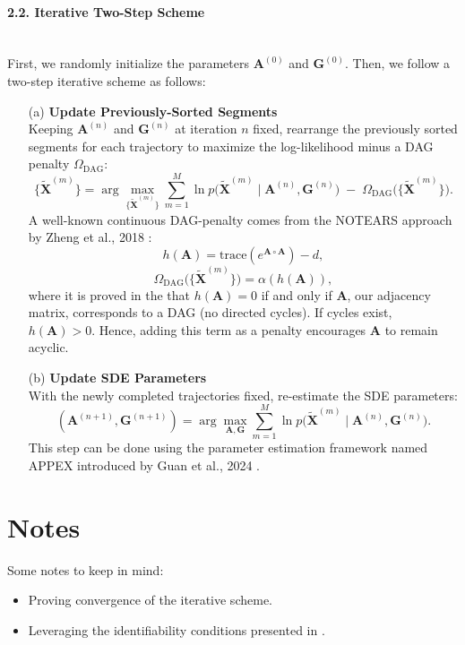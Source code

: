 \documentclass[a4paper, 11pt]{article}
\begin{document}
\begin{sloppypar}
\paragraph{2.2. Iterative Two-Step Scheme} \mbox{}\\
First, we randomly initialize the parameters
$\mathbf{A}^{(0)}$ and $\mathbf{G}^{(0)}$. Then, we follow a two-step
iterative scheme as follows:
\begin{enumerate}
  \item[(a)] \textbf{Update Previously-Sorted Segments} \\
    Keeping $\mathbf{A}^{(n)}$ and $\mathbf{G}^{(n)}$ at iteration $n$ fixed, rearrange the
    previously sorted segments for each trajectory to maximize the log-likelihood minus a
    DAG penalty $\Omega_{\mathrm{DAG}}$:
    \[
    \{\widetilde{\mathbf{X}}^{(m)}\}
    = 
    \arg\max_{\{\widetilde{\mathbf{X}}^{(m)}\}}
    \sum_{m=1}^M
    \ln p\bigl(\widetilde{\mathbf{X}}^{(m)} \mid \mathbf{A}^{(n)}, \mathbf{G}^{(n)}\bigr)
    \;-\; 
    \Omega_{\mathrm{DAG}}\bigl(\{\widetilde{\mathbf{X}}^{(m)}\}\bigr).
    \]
    A well-known continuous DAG-penalty comes from the NOTEARS approach by
    Zheng et al., 2018 \cite{zheng2018dagstearscontinuousoptimization}:
    \[
    h(\mathbf{A})
    = \text{trace}(e^{\mathbf{A} \circ \mathbf{A}})-d,
    \]
    \[
    \Omega_{\mathrm{DAG}}\bigl(\{\widetilde{\mathbf{X}}^{(m)}\}\bigr)
    = \alpha (h(\mathbf{A})),
    \]
    where it is proved in the \cite{zheng2018dagstearscontinuousoptimization} that
    $h(\mathbf{A}) = 0$ if and only if $\mathbf{A}$,
    our adjacency matrix, corresponds to a DAG (no directed cycles). If cycles exist,
    $h(\mathbf{A}) > 0$. Hence, adding this term as a penalty encourages $\mathbf{A}$
    to remain acyclic.
  \item[(b)] \textbf{Update SDE Parameters} \\
    With the newly completed trajectories fixed, re-estimate the SDE parameters:
    \[
    (\mathbf{A}^{(n+1)}, \mathbf{G}^{(n+1)}) 
    = 
    \arg\max_{\mathbf{A}, \mathbf{G}}
    \sum_{m=1}^M
    \ln p\bigl(\widetilde{\mathbf{X}}^{(m)} \mid \mathbf{A}^{(n)}, \mathbf{G}^{(n)}\bigr).
    \]
    This step can be done using the parameter estimation framework named APPEX introduced
    by Guan et al., 2024 \cite{guan2024identifyingdriftdiffusioncausal}.
  \end{enumerate}

\section{Notes}\label{s:3}
Some notes to keep in mind:
\begin{itemize}
  \item Proving convergence of the iterative scheme.
  \item Leveraging the identifiability conditions presented in \cite{guan2024identifyingdriftdiffusioncausal}.
\end{itemize}





\end{sloppypar}
\end{document}
